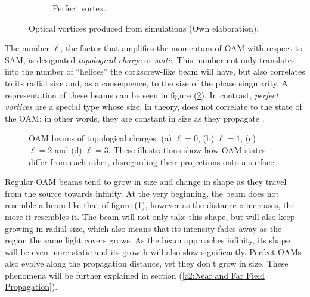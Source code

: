\begin{figure}[htbp]
\begin{subfigure}[b]{0.45\textwidth}
        \caption{Perfect vortex.}
    \end{subfigure}
    \caption{Optical vortices produced from simulations (Own elaboration).}
    \label{fig:Example_OAM}
\end{figure}

The number $\ell$, the factor that amplifies the momentum of OAM with respect to SAM, is designated \textit{topological charge} or \textit{state}. This number not only translates into the number of ``helices'' the corkscrew-like beam will have, but also correlates to its radial size and, as a consequence, to the size of the phase singularity. A representation of these beams can be seen in figure (\ref{fig:Different_OAM_Beams}). In contrast, \textit{perfect vortices} are a special type whose size, in theory, does not correlate to the state of the OAM; in other words, they are constant in size as they propagate \cite{Thesis_Herbert_PerfectVortices:2020}.

\begin{figure}[htbp]
    \centering
    \caption{OAM beams of topological charges: (a) $\ell = 0$, (b) $\ell = 1$, (c) $\ell = 2$ and (d) $\ell = 3$. These illustrations show how OAM states differ from each other, disregarding their projections onto a surface \cite{Yao-Padgett:2011}.}
    \label{fig:Different_OAM_Beams}
\end{figure}

Regular OAM beams tend to grow in size and change in shape as they travel from the source towards infinity. At the very beginning, the beam does not resemble a beam like that of figure (\ref{fig:Example_OAM}), however as the distance $z$ increases, the more it resembles it. The beam will not only take this shape, but will also keep growing in radial size, which also means that its intensity fades away as the region the same light covers grows. As the beam approaches infinity, its shape will be even more static and its growth will also slow significantly. Perfect OAMs also evolve along the propagation distance, yet they don't grow in size. These phenomena will be further explained in section (\ref{c2:Near and Far Field Propagation}).


